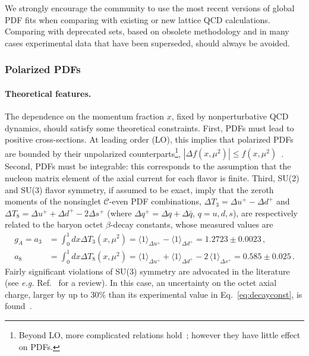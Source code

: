 We strongly encourage the community to use the most recent versions
of global PDF fits when comparing with existing or new
lattice QCD calculations.
%
Comparing with deprecated sets, based on obsolete methodology
and in many cases experimental data that have been
superseded, should always be avoided.

\subsubsection{Polarized PDFs}
\label{sec:polPDFs}

\paragraph*{Theoretical features.}

The dependence on the momentum fraction $x$, fixed by nonperturbative QCD 
dynamics, should satisfy some theoretical constraints.
%
First, PDFs must lead to positive cross-sections.
At leading order (LO), this implies that polarized 
PDFs are bounded by their unpolarized counterparts\footnote{Beyond LO, more 
complicated relations hold~\cite{Altarelli:1998gn}; however they have little
effect on PDFs.}, $|\Delta f(x,\mu^2)|\leq f(x,\mu^2)$~\cite{Altarelli:1998gn}.
%
Second, PDFs must be integrable: this corresponds to the assumption 
that the nucleon matrix element of the axial current for each flavor is finite.
%
Third, SU(2) and SU(3) flavor symmetry, if assumed to be exact, imply that 
the zeroth moments of the nonsinglet $\mathcal{C}$-even PDF combinations,
$\Delta T_3=\Delta u^+ -\Delta d^+$ and 
$\Delta T_8 = \Delta u^+ +\Delta d^+ -2\Delta s^+$ 
(where $\Delta q^+=\Delta q+\Delta\bar{q}$, $q=u,d,s$), are respectively
related to the baryon octet $\beta$-decay constants, whose 
measured values are~\cite{Olive:2016xmw}
\begin{align}
 g_A  = a_3
 & =
 \int_0^1 dx \Delta T_3 (x,\mu^2)
 = \langle 1\rangle_{\Delta u^+} - \langle 1\rangle_{\Delta d^+}  = 1.2723 \pm 0.0023\,,
 \label{eq:a3}
 \\
 a_8
 & =
 \int_0^1 dx \Delta T_8 (x,\mu^2)
 = \langle 1 \rangle_{\Delta u^+} + \langle 1 \rangle_{\Delta d^+} -2\,\langle 1 \rangle_{\Delta s^+} 
 =0.585  \pm 0.025
 \,.
\label{eq:decayconst}
\end{align}
%
Fairly significant violations of SU(3) symmetry are advocated
in the literature (see {\it e.g.} Ref.~\cite{Cabibbo:2003cu} for a review). 
%
In this case, an uncertainty on the octet axial charge, larger by up to $30\%$ 
than its experimental value in Eq.~\eqref{eq:decayconst}, 
is found~\cite{FloresMendieta:1998ii}. 

